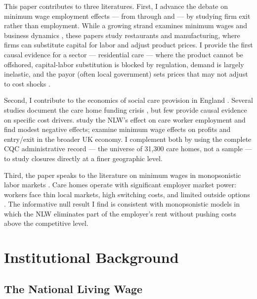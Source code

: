 \documentclass[12pt]{article}
\begin{document}
This paper contributes to three literatures. First, I advance the debate on minimum wage employment effects --- from \citet{card1994minimum} through \citet{dube2010minimum} and \citet{cengiz2019effect} --- by studying firm exit rather than employment. While a growing strand examines minimum wages and business dynamics \citep{aaronson2018industry, harasztosi2019pays, dustmann2022reallocation}, these papers study restaurants and manufacturing, where firms can substitute capital for labor and adjust product prices. I provide the first causal evidence for a sector --- residential care --- where the product cannot be offshored, capital-labor substitution is blocked by regulation, demand is largely inelastic, and the payor (often local government) sets prices that may not adjust to cost shocks \citep{fernandez2018nursing, machin2003minimum}.

Second, I contribute to the economics of social care provision in England \citep{burchardt2012funding, humphries2016social, crawford2021social}. Several studies document the care home funding crisis \citep{laing2020care, bottery2018home}, but few provide causal evidence on specific cost drivers. \citet{giupponi2022should} study the NLW's effect on care worker employment and find modest negative effects; \citet{draca2011minimum} examine minimum wage effects on profits and entry/exit in the broader UK economy. I complement both by using the complete CQC administrative record --- the universe of 31,300 care homes, not a sample --- to study closures directly at a finer geographic level.

Third, the paper speaks to the literature on minimum wages in monopsonistic labor markets \citep{manning2003monopsony, dube2020monopsony}. Care homes operate with significant employer market power: workers face thin local markets, high switching costs, and limited outside options \citep{skills2019state, hussain2016social}. The informative null result I find is consistent with monopsonistic models in which the NLW eliminates part of the employer's rent without pushing costs above the competitive level.


\section{Institutional Background}
\label{sec:background}

\subsection{The National Living Wage}
\end{document}
